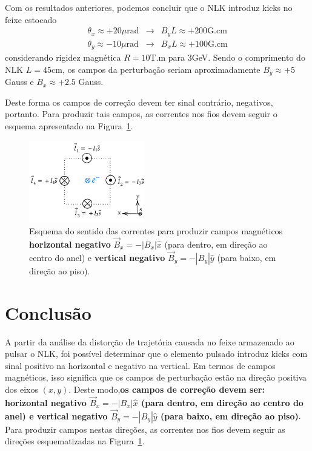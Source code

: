 \documentclass[a4paper,
               keeplastbox,   %
               ]{jacow}
\begin{document}
Com os resultados anteriores, podemos concluir que o NLK introduz kicks no feixe estocado
\begin{eqnarray*}
\theta_x \approx +20\mu\text{rad} &\to& B_yL \approx +200 \text{G.cm} \\
\theta_y \approx -10\mu\text{rad} &\to& B_xL \approx +100 \text{G.cm} 
\end{eqnarray*}
considerando rigidez magnética $R=10$T.m para 3GeV. Sendo o comprimento do NLK $L=45$cm, os campos da perturbação seriam aproximadamente $B_y\approx+5$ Gauss e $B_x\approx+2.5$ Gauss. 

Deste forma os campos de correção devem ter sinal contrário, negativos, portanto. 
Para produzir tais campos, as correntes nos fios devem seguir o esquema apresentado na Figura~\ref{fig:nlk_wires}.
\begin{figure}
    \centering
    \includegraphics*[width=0.45\textwidth]{nlk_wires.png}
    \caption{Esquema do sentido das correntes para produzir campos magnéticos \textbf{horizontal negativo} $\vec{B}_x = -|B_x|\hat{x}$ (para dentro, em direção ao centro do anel) e \textbf{vertical negativo} $\vec{B}_y = -|B_y| \hat{y}$ (para baixo, em direção ao piso).}
    \label{fig:nlk_wires}
\end{figure}
\section{Conclusão}
A partir da análise da distorção de trajetória causada no feixe armazenado ao pulsar o NLK, foi possível determinar que o elemento pulsado introduz kicks com sinal positivo na horizontal e negativo na vertical. Em termos de campos magnéticos, isso significa que os campos de perturbação estão na direção positiva dos eixos $(x, y)$. Deste modo,\textbf{os campos de correção devem ser: horizontal negativo $\vec{B}_x = -|B_x|\hat{x}$ (para dentro, em direção ao centro do anel) e vertical negativo $\vec{B}_y = -|B_y| \hat{y}$ (para baixo, em direção ao piso)}. Para produzir campos nestas direções, as correntes nos fios devem seguir as direções esquematizadas na Figura~\ref{fig:nlk_wires}.
\end{document}
